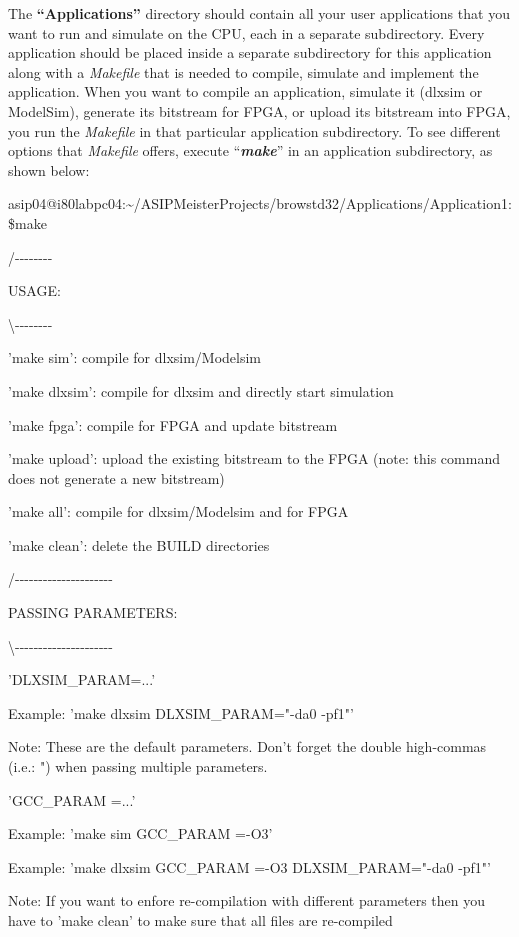 \documentclass[
]{article}
\begin{document}
The \textbf{``Applications''} directory should contain all your user
applications that you want to run and simulate on the CPU, each in a
separate subdirectory. Every application should be placed inside a
separate subdirectory for this application along with a \emph{Makefile}
that is needed to compile, simulate and implement the application. When
you want to compile an application, simulate it (dlxsim or ModelSim),
generate its bitstream for FPGA, or upload its bitstream into FPGA, you
run the \emph{Makefile} in that particular application subdirectory. To
see different options that \emph{Makefile} offers, execute
``\emph{\textbf{make}}'' in an application subdirectory, as shown below:

asip04@i80labpc04:\textasciitilde/ASIPMeisterProjects/browstd32/Applications/Application1:\$make

/-\/-\/-\/-\/-\/-\/-\/-

\textbar{} USAGE:

\textbackslash-\/-\/-\/-\/-\/-\/-\/-

'make sim': compile for dlxsim/Modelsim

'make dlxsim': compile for dlxsim and directly start simulation

'make fpga': compile for FPGA and update bitstream

'make upload': upload the existing bitstream to the FPGA (note: this
command does not generate a new bitstream)

'make all': compile for dlxsim/Modelsim and for FPGA

'make clean': delete the BUILD directories

/-\/-\/-\/-\/-\/-\/-\/-\/-\/-\/-\/-\/-\/-\/-\/-\/-\/-\/-\/-\/-

\textbar{} PASSING PARAMETERS:

\textbackslash-\/-\/-\/-\/-\/-\/-\/-\/-\/-\/-\/-\/-\/-\/-\/-\/-\/-\/-\/-\/-

'DLXSIM\_PARAM=...'

Example: 'make dlxsim DLXSIM\_PARAM="-da0 -pf1"'

Note: These are the default parameters. Don't forget the double
high-commas (i.e.: ") when passing multiple parameters.

'GCC\_PARAM =...'

Example: 'make sim GCC\_PARAM =-O3'

Example: 'make dlxsim GCC\_PARAM =-O3 DLXSIM\_PARAM="-da0 -pf1"'

Note: If you want to enfore re-compilation with different parameters
then you have to 'make clean' to make sure that all files are
re-compiled
\end{document}
